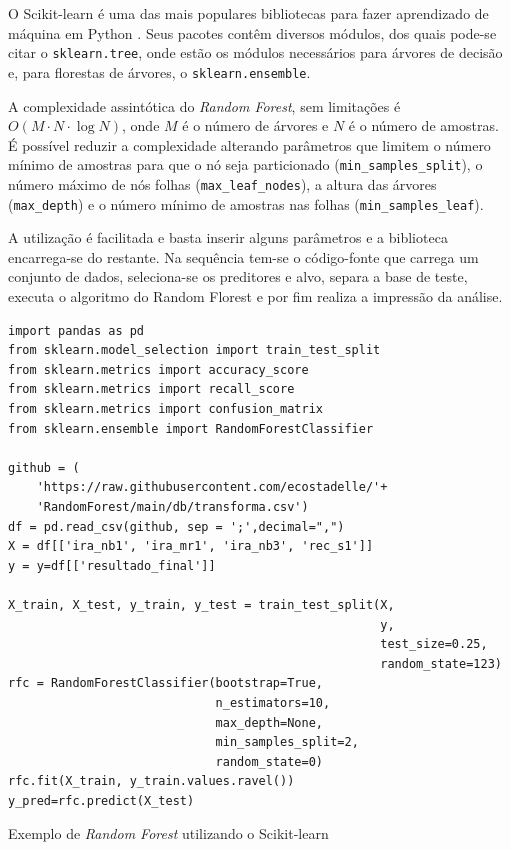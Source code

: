 \documentclass[12pt]{article}
\begin{document}
O Scikit-learn \cite{scikit-learn} é uma das mais populares bibliotecas para fazer aprendizado de máquina em Python \cite{Grus_2019}. Seus pacotes contêm diversos módulos, dos quais pode-se citar o \texttt{sklearn.tree}, onde estão os módulos necessários para árvores de decisão e, para florestas de árvores, o \texttt{sklearn.ensemble}.

A complexidade assintótica do \emph{Random Forest}, sem limitações é $O(M\cdot N \cdot\log{N})$, onde $M$ é o número de árvores e $N$ é o número de amostras. É possível reduzir a complexidade alterando parâmetros que limitem o número mínimo de amostras para que o nó seja particionado (\texttt{min\_samples\_split}), o número máximo de nós folhas (\texttt{max\_leaf\_nodes}), a altura das árvores (\texttt{max\_depth}) e o número mínimo de amostras nas folhas (\texttt{min\_samples\_leaf}).

A utilização é facilitada e basta inserir alguns parâmetros e a biblioteca encarrega-se do restante. Na sequência tem-se o código-fonte que carrega um conjunto de dados, seleciona-se os preditores e alvo, separa a base de teste, executa o algoritmo do Random Florest e por fim realiza a impressão da análise.


\begin{listing}[H]
\begin{verbatim}
import pandas as pd
from sklearn.model_selection import train_test_split
from sklearn.metrics import accuracy_score
from sklearn.metrics import recall_score
from sklearn.metrics import confusion_matrix
from sklearn.ensemble import RandomForestClassifier

github = (
    'https://raw.githubusercontent.com/ecostadelle/'+
    'RandomForest/main/db/transforma.csv')
df = pd.read_csv(github, sep = ';',decimal=",")
X = df[['ira_nb1', 'ira_mr1', 'ira_nb3', 'rec_s1']]
y = y=df[['resultado_final']]

X_train, X_test, y_train, y_test = train_test_split(X, 
                                                    y, 
                                                    test_size=0.25, 
                                                    random_state=123)
rfc = RandomForestClassifier(bootstrap=True,
                             n_estimators=10,
                             max_depth=None,
                             min_samples_split=2,
                             random_state=0)
rfc.fit(X_train, y_train.values.ravel())
y_pred=rfc.predict(X_test)
\end{verbatim}
\caption{Exemplo de \emph{Random Forest} utilizando o Scikit-learn}
\end{listing}
\end{document}
